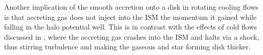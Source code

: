\documentclass[fleqn,usenatbib]{mnras}
\begin{document}
Another implication of the smooth accretion onto a disk in rotating cooling flows is that accreting gas does not inject into the ISM the momentum it gained while falling in the halo potential well.
This is in contrast with the effects of cold flows discussed in \cite{Dekel2009}, where the accreting gas crashes into the ISM and halts via a shock, thus stirring turbulence and making the gaseous and star forming disk thicker. 
    

\end{document}
